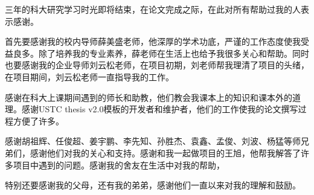 \begin{acknowledgements}

三年的科大研究学习时光即将结束，在论文完成之际，在此对所有帮助过我的人表示感谢。

首先要感谢我的校内导师薛美盛老师，他深厚的学术功底，严谨的工作态度使我受益良多。除了培养我的专业素养，薛老师在生活上也给予我很多关心和帮助。同时也要感谢我的企业导师刘云松老师，在项目初期，刘老师帮我理清了项目的头绪，在项目期间，刘云松老师一直指导我的工作。

感谢在科大上课期间遇到的师长和助教，他们教会我课本上的知识和课本外的道理。感谢USTC thesis v2.0模板的开发者和维护者，他们的工作使我的论文撰写过程方便了许多。

感谢胡祖辉、任俊超、姜宇鹏、李先知、孙胜杰、袁鑫、孟俊、刘波、杨猛等师兄弟们，感谢他们对我的关心和支持。感谢和我一起做项目的王旭，他帮我解答了许多项目中遇到的问题。感谢我的舍友在生活中对我的帮助，

特别还要感谢我的父母，还有我的弟弟，感谢他们一直以来对我的理解和鼓励。

\end{acknowledgements}
